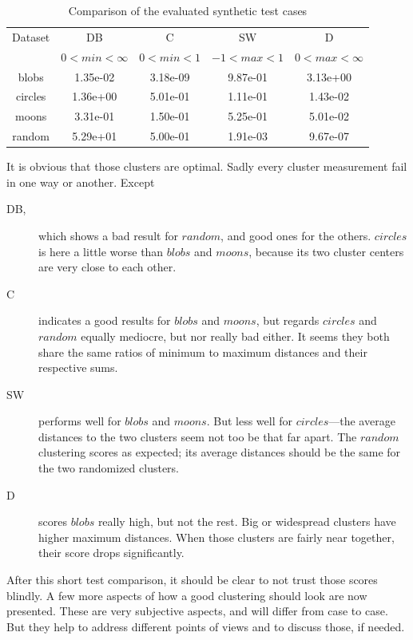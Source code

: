 \begin{table}%
\caption{Comparison of the evaluated synthetic test cases}\label{tbl:syn_compare}
\centering
{}
\begin{tabular}{cSSSS}
\toprule
Dataset & {DB} &{C}&{SW}&{D}\\
			& {\scriptsize $0<min<\infty$} &{\scriptsize $0<min<1$}&{\scriptsize $-1<max<1$}&{\scriptsize $0<max<\infty$}\\
\midrule
blobs	& 1.35e-02 & 3.18e-09 & 9.87e-01& 3.13e+00\\
circles	& 1.36e+00& 5.01e-01 & 1.11e-01 & 1.43e-02\\
moons	& 3.31e-01 & 1.50e-01 & 5.25e-01 & 5.01e-02\\
random& 5.29e+01 & 5.00e-01 & 1.91e-03 & 9.67e-07\\
\bottomrule
\end{tabular}
\end{table}
%
\newpage
It is obvious that those clusters are optimal. Sadly every cluster measurement fail in one way or another. Except 
\begin{description}
\item[DB,] which shows a bad result for $random$, and good ones for the others. $circles$ is here a little worse than $blobs$ and $moons$, because its two cluster centers are very close to each other.

\item[C] indicates a good results for $blobs$ and $moons$, but regards $circles$ and $random$ equally mediocre, but nor really bad either. It seems they both share the same ratios of minimum to maximum distances and their respective sums.

\item[SW] performs well for $blobs$ and $moons$. But less well for $circles$---the average distances to the two clusters seem not too be that far apart. The $random$ clustering scores as expected; its average distances should be the same for the two randomized clusters.

\item[D] scores $blobs$ really high, but not the rest. Big or widespread clusters have higher maximum distances. When those clusters are fairly near together, their score drops significantly.
\end{description}
%
After this short test comparison, it should be clear to not trust those scores blindly. A few more aspects of how a good clustering should look are now presented. These are very subjective aspects, and will differ from case to case. But they help to address different points of views and to discuss those, if needed.
